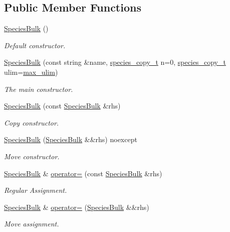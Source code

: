 \subsection*{Public Member Functions}
\begin{DoxyCompactItemize}
\item 
\hyperlink{classSpeciesBulk_a41d65d8e83b8aad1b328ab35da984cae}{Species\+Bulk} ()
\begin{DoxyCompactList}\small\item\em Default constructor. \end{DoxyCompactList}\item 
\hyperlink{classSpeciesBulk_a401987f8f89fc0f3ccfaa9409fd761e1}{Species\+Bulk} (const string \&name, \hyperlink{common_8h_a3503f321fd36304ee274141275cca586}{species\+\_\+copy\+\_\+t} n=0, \hyperlink{common_8h_a3503f321fd36304ee274141275cca586}{species\+\_\+copy\+\_\+t} ulim=\hyperlink{common_8h_adaf831a0b61083f29adf8fc6e8edab35}{max\+\_\+ulim})
\begin{DoxyCompactList}\small\item\em The main constructor. \end{DoxyCompactList}\item 
\hyperlink{classSpeciesBulk_af58063977554bb4403a94266a9deedcc}{Species\+Bulk} (const \hyperlink{classSpeciesBulk}{Species\+Bulk} \&rhs)
\begin{DoxyCompactList}\small\item\em Copy constructor. \end{DoxyCompactList}\item 
\hyperlink{classSpeciesBulk_adabbd68f6997c2400e2c2841d605a449}{Species\+Bulk} (\hyperlink{classSpeciesBulk}{Species\+Bulk} \&\&rhs) noexcept
\begin{DoxyCompactList}\small\item\em Move constructor. \end{DoxyCompactList}\item 
\hyperlink{classSpeciesBulk}{Species\+Bulk} \& \hyperlink{classSpeciesBulk_ab7cde6b18a2d5232f39c0b82ac8b3cf0}{operator=} (const \hyperlink{classSpeciesBulk}{Species\+Bulk} \&rhs)
\begin{DoxyCompactList}\small\item\em Regular Assignment. \end{DoxyCompactList}\item 
\hyperlink{classSpeciesBulk}{Species\+Bulk} \& \hyperlink{classSpeciesBulk_ae4fc624a8e69de73ed83a385c6a4b945}{operator=} (\hyperlink{classSpeciesBulk}{Species\+Bulk} \&\&rhs)
\begin{DoxyCompactList}\small\item\em Move assignment. \end{DoxyCompactList}\item 

\end{DoxyCompactItemize}
